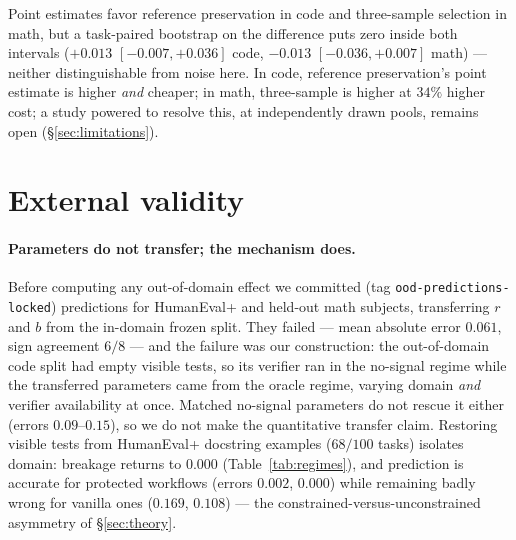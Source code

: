\documentclass{article}
\newcommand{\rrate}{r}
\newcommand{\brate}{b}
\begin{document}
Point estimates favor reference preservation in code and three-sample selection
in math, but a task-paired bootstrap on the difference puts zero inside both
intervals ($+0.013$ $[-0.007,+0.036]$ code, $-0.013$ $[-0.036,+0.007]$ math)
--- neither distinguishable from noise here. In code, reference preservation's
point estimate is higher \emph{and} cheaper; in math, three-sample is higher at
$34\%$ higher cost; a study powered to resolve this, at independently drawn
pools, remains open (\S\ref{sec:limitations}).

\section{External validity}
\label{sec:external}

\paragraph{Parameters do not transfer; the mechanism does.} Before computing any
out-of-domain effect we committed (tag \texttt{ood-predictions-locked})
predictions for HumanEval+ and held-out math subjects, transferring $\rrate$ and
$\brate$ from the in-domain frozen split. They failed --- mean absolute error
$0.061$, sign agreement $6/8$ --- and the failure was our construction: the
out-of-domain code split had empty visible tests, so its verifier ran in the
no-signal regime while the transferred parameters came from the oracle regime,
varying domain \emph{and} verifier availability at once. Matched no-signal
parameters do not rescue it either (errors $0.09$--$0.15$), so we do not make the
quantitative transfer claim. Restoring visible tests from HumanEval+ docstring
examples ($68/100$ tasks) isolates domain: breakage returns to $0.000$
(Table~\ref{tab:regimes}), and prediction is accurate for protected workflows
(errors $0.002$, $0.000$) while remaining badly wrong for vanilla ones ($0.169$,
$0.108$) --- the constrained-versus-unconstrained asymmetry of
\S\ref{sec:theory}.
\end{document}
